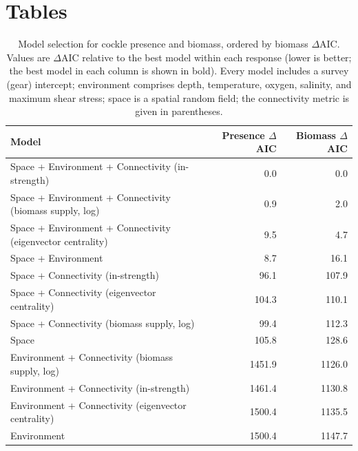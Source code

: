 \section{Tables}

\begin{table}[ht]
\centering
\caption{Model selection for cockle presence and biomass, ordered by biomass $\Delta$AIC. Values are $\Delta$AIC relative to the best model within each response (lower is better; the best model in each column is shown in bold). Every model includes a survey (gear) intercept; environment comprises depth, temperature, oxygen, salinity, and maximum shear stress; space is a spatial random field; the connectivity metric is given in parentheses.}
\label{tab:model-selection}
\begin{tabular}{lrr}
\toprule
Model & Presence $\Delta$AIC & Biomass $\Delta$AIC \\
\midrule
Space + Environment + Connectivity (in-strength) & 0.0 & 0.0 \\
Space + Environment + Connectivity (biomass supply, log) & 0.9 & 2.0 \\
Space + Environment + Connectivity (eigenvector centrality) & 9.5 & 4.7 \\
Space + Environment & 8.7 & 16.1 \\
Space + Connectivity (in-strength) & 96.1 & 107.9 \\
Space + Connectivity (eigenvector centrality) & 104.3 & 110.1 \\
Space + Connectivity (biomass supply, log) & 99.4 & 112.3 \\
Space & 105.8 & 128.6 \\
Environment + Connectivity (biomass supply, log) & 1451.9 & 1126.0 \\
Environment + Connectivity (in-strength) & 1461.4 & 1130.8 \\
Environment + Connectivity (eigenvector centrality) & 1500.4 & 1135.5 \\
Environment & 1500.4 & 1147.7 \\
\bottomrule
\end{tabular}
\end{table}

